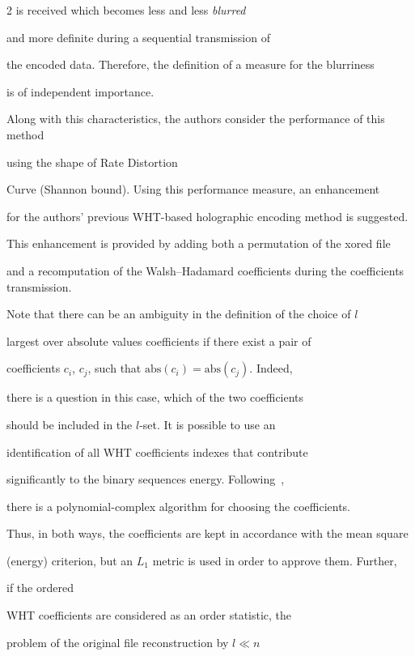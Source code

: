 \begin{multicols}{2}
is received which becomes less and less {\em blurred}

and more definite during a sequential transmission of 

the encoded data. Therefore, the definition of a measure for the blurriness 

is of independent importance.

 Along with this characteristics, the authors consider the performance of this method 

 using  the shape of Rate Distortion

Curve (Shannon bound). Using this performance measure,  an enhancement 

for the authors' previous WHT-based holographic encoding method is suggested.

This enhancement is provided by adding both a permutation of the xored file 

and a recomputation of the Walsh--Hadamard coefficients during the coefficients transmission.





Note that there can be an ambiguity in the definition of the choice of $l$ 

largest over absolute values coefficients if there exist a pair of

coefficients $c_i$, $c_j$, such that $\mathrm{abs}\left(c_i\right)=\mathrm{abs}\left(c_j\right)$. Indeed, 

there is a question in this case, which of the two coefficients

should be included in the $l$-set. It is possible to use an 

identification of all WHT coefficients indexes that contribute 

significantly to the binary sequences energy. Following~\cite{6-fr}, 

there is a polynomial-complex algorithm for choosing the coefficients.



Thus, in both ways, the coefficients are kept in accordance with the mean square 

(energy) criterion, but an $L_1$ metric is used in order to approve them. Further, 

if the ordered 

WHT coefficients are considered as an order statistic, the

problem of the original file reconstruction by $l \ll n$ 


\end{multicols}
